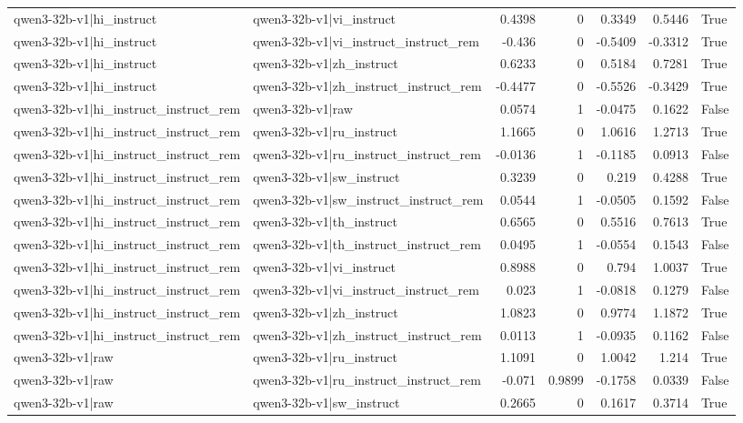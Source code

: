 \begin{table}
\begin{tabular}{l l r r r r l}
qwen3-32b-v1|hi_instruct & qwen3-32b-v1|vi_instruct & 0.4398 & 0 & 0.3349 & 0.5446 & True \\
qwen3-32b-v1|hi_instruct & qwen3-32b-v1|vi_instruct_instruct_rem & -0.436 & 0 & -0.5409 & -0.3312 & True \\
qwen3-32b-v1|hi_instruct & qwen3-32b-v1|zh_instruct & 0.6233 & 0 & 0.5184 & 0.7281 & True \\
qwen3-32b-v1|hi_instruct & qwen3-32b-v1|zh_instruct_instruct_rem & -0.4477 & 0 & -0.5526 & -0.3429 & True \\
qwen3-32b-v1|hi_instruct_instruct_rem & qwen3-32b-v1|raw & 0.0574 & 1 & -0.0475 & 0.1622 & False \\
qwen3-32b-v1|hi_instruct_instruct_rem & qwen3-32b-v1|ru_instruct & 1.1665 & 0 & 1.0616 & 1.2713 & True \\
qwen3-32b-v1|hi_instruct_instruct_rem & qwen3-32b-v1|ru_instruct_instruct_rem & -0.0136 & 1 & -0.1185 & 0.0913 & False \\
qwen3-32b-v1|hi_instruct_instruct_rem & qwen3-32b-v1|sw_instruct & 0.3239 & 0 & 0.219 & 0.4288 & True \\
qwen3-32b-v1|hi_instruct_instruct_rem & qwen3-32b-v1|sw_instruct_instruct_rem & 0.0544 & 1 & -0.0505 & 0.1592 & False \\
qwen3-32b-v1|hi_instruct_instruct_rem & qwen3-32b-v1|th_instruct & 0.6565 & 0 & 0.5516 & 0.7613 & True \\
qwen3-32b-v1|hi_instruct_instruct_rem & qwen3-32b-v1|th_instruct_instruct_rem & 0.0495 & 1 & -0.0554 & 0.1543 & False \\
qwen3-32b-v1|hi_instruct_instruct_rem & qwen3-32b-v1|vi_instruct & 0.8988 & 0 & 0.794 & 1.0037 & True \\
qwen3-32b-v1|hi_instruct_instruct_rem & qwen3-32b-v1|vi_instruct_instruct_rem & 0.023 & 1 & -0.0818 & 0.1279 & False \\
qwen3-32b-v1|hi_instruct_instruct_rem & qwen3-32b-v1|zh_instruct & 1.0823 & 0 & 0.9774 & 1.1872 & True \\
qwen3-32b-v1|hi_instruct_instruct_rem & qwen3-32b-v1|zh_instruct_instruct_rem & 0.0113 & 1 & -0.0935 & 0.1162 & False \\
qwen3-32b-v1|raw & qwen3-32b-v1|ru_instruct & 1.1091 & 0 & 1.0042 & 1.214 & True \\
qwen3-32b-v1|raw & qwen3-32b-v1|ru_instruct_instruct_rem & -0.071 & 0.9899 & -0.1758 & 0.0339 & False \\
qwen3-32b-v1|raw & qwen3-32b-v1|sw_instruct & 0.2665 & 0 & 0.1617 & 0.3714 & True \\

\end{tabular}
\end{table}

